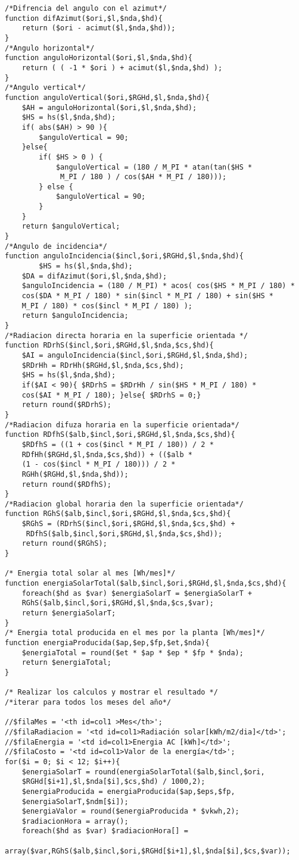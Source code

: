 \begin{verbatim}
/*Difrencia del angulo con el azimut*/
function difAzimut($ori,$l,$nda,$hd){
	return ($ori - acimut($l,$nda,$hd));
}
/*Angulo horizontal*/
function anguloHorizontal($ori,$l,$nda,$hd){
	return ( ( -1 * $ori ) + acimut($l,$nda,$hd) );
}
/*Angulo vertical*/
function anguloVertical($ori,$RGHd,$l,$nda,$hd){
	$AH = anguloHorizontal($ori,$l,$nda,$hd);
	$HS = hs($l,$nda,$hd);
	if( abs($AH) > 90 ){ 
		$anguloVertical = 90; 
	}else{ 
		if( $HS > 0 ) {
			$anguloVertical = (180 / M_PI * atan(tan($HS *
			 M_PI / 180 ) / cos($AH * M_PI / 180)));
		} else { 
			$anguloVertical = 90;
		}
	}
	return $anguloVertical;
}
/*Angulo de incidencia*/
function anguloIncidencia($incl,$ori,$RGHd,$l,$nda,$hd){
        $HS = hs($l,$nda,$hd);
	$DA = difAzimut($ori,$l,$nda,$hd);
	$anguloIncidencia = (180 / M_PI) * acos( cos($HS * M_PI / 180) *
	cos($DA * M_PI / 180) * sin($incl * M_PI / 180) + sin($HS * 
	M_PI / 180) * cos($incl * M_PI / 180) );
	return $anguloIncidencia;
}
/*Radiacion directa horaria en la superficie orientada */
function RDrhS($incl,$ori,$RGHd,$l,$nda,$cs,$hd){
	$AI = anguloIncidencia($incl,$ori,$RGHd,$l,$nda,$hd);
	$RDrHh = RDrHh($RGHd,$l,$nda,$cs,$hd);
	$HS = hs($l,$nda,$hd);
	if($AI < 90){ $RDrhS = $RDrHh / sin($HS * M_PI / 180) * 
	cos($AI * M_PI / 180); }else{ $RDrhS = 0;}
	return round($RDrhS);
}
/*Radiacion difuza horaria en la superficie orientada*/
function RDfhS($alb,$incl,$ori,$RGHd,$l,$nda,$cs,$hd){
	$RDfhS = ((1 + cos($incl * M_PI / 180)) / 2 * 
	RDfHh($RGHd,$l,$nda,$cs,$hd)) + (($alb *
	(1 - cos($incl * M_PI / 180))) / 2 *
	RGHh($RGHd,$l,$nda,$hd));
	return round($RDfhS);
}
/*Radiacion global horaria den la superficie orientada*/
function RGhS($alb,$incl,$ori,$RGHd,$l,$nda,$cs,$hd){
	$RGhS = (RDrhS($incl,$ori,$RGHd,$l,$nda,$cs,$hd) +
	 RDfhS($alb,$incl,$ori,$RGHd,$l,$nda,$cs,$hd));
	return round($RGhS);
}

/* Energia total solar al mes [Wh/mes]*/
function energiaSolarTotal($alb,$incl,$ori,$RGHd,$l,$nda,$cs,$hd){
	foreach($hd as $var) $energiaSolarT = $energiaSolarT + 
	RGhS($alb,$incl,$ori,$RGHd,$l,$nda,$cs,$var);
	return $energiaSolarT;
}
/* Energia total producida en el mes por la planta [Wh/mes]*/
function energiaProducida($ap,$ep,$fp,$et,$nda){
	$energiaTotal = round($et * $ap * $ep * $fp * $nda);
	return $energiaTotal;
}

/* Realizar los calculos y mostrar el resultado */
/*iterar para todos los meses del año*/

//$filaMes = '<th id=col1 >Mes</th>';
//$filaRadiacion = '<td id=col1>Radiación solar[kWh/m2/dia]</td>';
//$filaEnergia = '<td id=col1>Energia AC [kWh]</td>';
//$filaCosto = '<td id=col1>Valor de la energía</td>';
for($i = 0; $i < 12; $i++){
	$energiaSolarT = round(energiaSolarTotal($alb,$incl,$ori,
	$RGHd[$i+1],$l,$nda[$i],$cs,$hd) / 1000,2);
	$energiaProducida = energiaProducida($ap,$eps,$fp,
	$energiaSolarT,$ndm[$i]);
	$energiaValor = round($energiaProducida * $vkwh,2);
	$radiacionHora = array();
	foreach($hd as $var) $radiacionHora[] =
	 array($var,RGhS($alb,$incl,$ori,$RGHd[$i+1],$l,$nda[$i],$cs,$var));


\end{verbatim}
